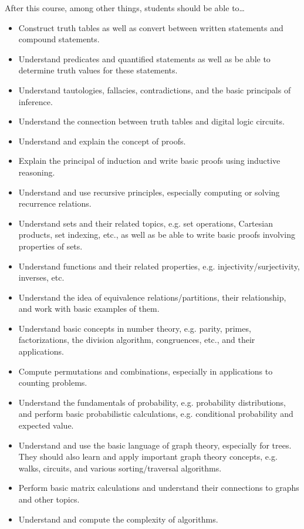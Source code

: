 \documentclass[11pt,letterpaper]{article}
\begin{document}
After this course, among other things, students should be able to\dots
	\begin{itemize} \itemsep=0.25ex
	\item Construct truth tables as well as convert between written statements and compound statements. 
	\item Understand predicates and quantified statements as well as be able to determine truth values for these statements. 
	\item Understand tautologies, fallacies, contradictions, and the basic principals of inference. 
	\item Understand the connection between truth tables and digital logic circuits.
	\item Understand and explain the concept of proofs.
	\item Explain the principal of induction and write basic proofs using inductive reasoning.
	\item Understand and use recursive principles, especially computing or solving recurrence relations.
	\item Understand sets and their related topics, e.g. set operations, Cartesian products, set indexing, etc., as well as be able to write basic proofs involving properties of sets. 
	\item Understand functions and their related properties, e.g. injectivity/surjectivity, inverses, etc. 
	\item Understand the idea of equivalence relations/partitions, their relationship, and work with basic examples of them.
	\item Understand basic concepts in number theory, e.g. parity, primes, factorizations, the division algorithm, congruences, etc., and their applications. 
	\item Compute permutations and combinations, especially in applications to counting problems. 
	\item Understand the fundamentals of probability, e.g. probability distributions, and perform basic probabilistic calculations, e.g. conditional probability and expected value.
	\item Understand and use the basic language of graph theory, especially for trees. They should also learn and apply important graph theory concepts, e.g. walks, circuits, and various sorting/traversal algorithms. 
	\item Perform basic matrix calculations and understand their connections to graphs and other topics. 
	\item Understand and compute the complexity of algorithms.
	\end{itemize}
\end{document}
